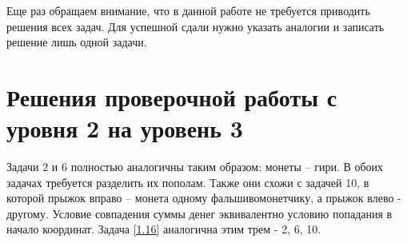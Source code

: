 Еще раз обращаем внимание, что в данной работе не требуется приводить решения всех задач. Для успешной сдали нужно указать аналогии и записать решение лишь одной задачи.

\section{Решения проверочной работы с уровня 2 на уровень 3}
%
%

Задачи 2 и 6 полностью аналогичны таким образом: монеты -- гири. В обоих задачах требуется разделить их пополам. Также они схожи с задачей 10, в которой прыжок вправо -- монета одному фальшивомонетчику, а прыжок влево - другому. Условие совпадения суммы денег эквивалентно условию попадания в начало координат.
Задача \ref{1.16} аналогична этим трем - 2, 6, 10.

%
%	

